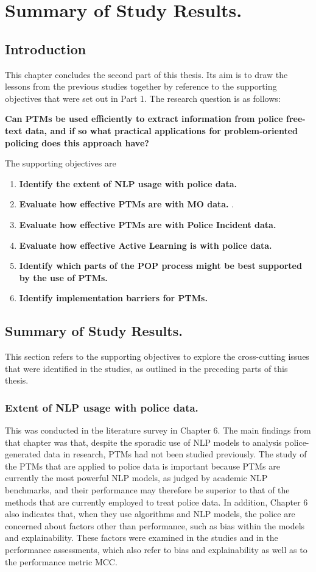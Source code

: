 \chapter{Summary of Study Results.}


\section{Introduction} This chapter concludes the second part of this thesis. Its aim is to draw the lessons from the previous studies together by reference to the supporting objectives that were set out in Part 1. The research question is as follows:


\textbf{Can PTMs be used efficiently to extract information from police free-text data, and if so what practical applications for problem-oriented policing does this approach have?}

The supporting objectives are

\begin{enumerate}
\item {\bf Identify the extent of NLP usage with police data.} 
\item {\bf Evaluate how effective PTMs are with MO data.} .
\item {\bf Evaluate how effective PTMs are with Police Incident data.} 
\item {\bf Evaluate how effective Active Learning is with police data.}  
\item {\bf Identify which parts of the POP process might be best supported by the use of PTMs.} 
\item {\bf Identify implementation barriers for PTMs.} 
\end{enumerate}

\section{Summary of Study Results.} This section refers to the supporting objectives to explore the cross-cutting issues that were identified in the studies, as outlined in the preceding parts of this thesis.

\subsection{Extent of NLP usage with police data.} This was conducted in the literature survey in Chapter 6. The main findings from that chapter was that, despite the sporadic use of NLP models to analysis police-generated data in research, PTMs had not been studied previously. The study of the PTMs that are applied to police data is important because PTMs are currently the most powerful NLP models, as judged by academic NLP benchmarks, and their performance may therefore be superior to that of the methods that are currently employed to treat police data. In addition, Chapter 6 also indicates that, when they use algorithms and NLP models, the police are concerned about factors other than performance, such as bias within the models and explainability. These factors were examined in the studies and in the performance assessments, which also refer to bias and explainability as well as to the performance metric MCC.

